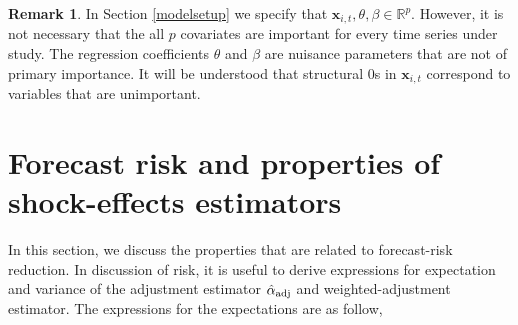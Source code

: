\documentclass[11pt]{article}
\def\mbf#1{\mathbf{#1}} %
\newcommand{\reals}{\mathbb{R}} %
\theoremstyle{definition}
\newtheorem{remark}{Remark}
\begin{document}
\begin{remark}
In Section \ref{modelsetup} we specify that $\mbf{x}_{i,t}, \theta, \beta \in \reals^p$. 
However, it is not necessary that the all $p$ covariates are important for every time series under study. The regression coefficients $\theta$ and $\beta$ are nuisance parameters that are not of primary importance. 
It will be understood that structural 0s in $\mbf{x}_{i,t}$ correspond to variables that are unimportant. 
\end{remark}



\section{Forecast risk and properties of shock-effects estimators}
\label{properties}

In this section, we discuss the properties that are related to forecast-risk reduction. In discussion of risk, it is useful to derive expressions for expectation and variance of the adjustment estimator $\hat{\alpha}_{\rm adj}$ and weighted-adjustment estimator.  The expressions for the expectations are as follow,
\end{document}
